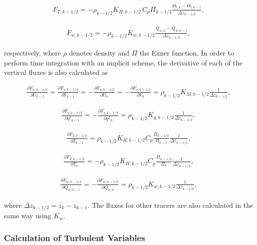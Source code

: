 \begin{eqnarray}F_{T,k-1/2}=-\rho_{k-1/2}K_{H,k-1/2}\,C_p\Pi_{k-1/2}\frac{\Theta_{l,k}-\Theta_{l,k-1}}{\Delta z_{k-1/2}},\end{eqnarray}

\begin{eqnarray}F_{w,k-1/2}=-\rho_{k-1/2}K_{w,k-1/2}\frac{Q_{w,k}-Q_{w,k-1}}{\Delta z_{k-1/2}},\end{eqnarray}

respectively, where \(\rho\) denotes density and \(\Pi\) the Exner function. In order to perform time integration with an implicit scheme, the derivative of each of the vertical fluxes is also
calculated as

\begin{eqnarray}\frac{\partial F_{u,k-1/2}}{\partial U_{k-1}}=\frac{\partial F_{v,k-1/2}}{\partial V_{k-1}}=-\frac{\partial F_{u,k-1/2}}{\partial U_{k}}=-\frac{\partial F_{v,k-1/2}}{\partial V_{k}}=\rho_{k-1/2}K_{M,k-1/2}\frac{1}{\Delta z_{k-1/2}},\end{eqnarray}

\begin{eqnarray}\frac{\partial F_{q,k-1/2}}{\partial {q^2}_ {k-1}}=-\frac{\partial F_{q,k-1/2}}{\partial {q^2}_ {k}}=\rho_{k-1/2}K_{q,k-1/2}\frac{1}{\Delta z_{k-1/2}},\end{eqnarray}

\begin{eqnarray}\frac{\partial F_{T,k-1/2}}{\partial T_{k-1}}=\rho_{k-1/2}K_{H,k-1/2}C_p\frac{\Pi_{k-1/2}}{\Pi_{k-1}}\frac{1}{\Delta z_{k-1/2}},\end{eqnarray}

\begin{eqnarray}\frac{\partial F_{T,k-1/2}}{\partial T_{k}}=-\rho_{k-1/2}K_{H,k-1/2}C_p\frac{\Pi_{k-1/2}}{\Pi_{k}}\frac{1}{\Delta z_{k-1/2}},\end{eqnarray}

\begin{eqnarray}\frac{\partial F_{w,k-1/2}}{\partial Q_{w,k-1}}=-\frac{\partial F_{w,k-1/2}}{\partial Q_{w,k}}=\rho_{k-1/2}K_{w,k-1/2}\frac{1}{\Delta z_{k-1/2}},\end{eqnarray}

where \(\Delta z_{k-1/2}=z_k-z_{k-1}\). The fluxes for other tracers are also calculated in the same way using \(K_w\).

\hypertarget{calculation-of-turbulent-variables}{%
\subsubsection{Calculation of Turbulent Variables}\label{calculation-of-turbulent-variables}}


